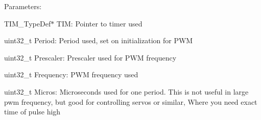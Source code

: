 Parameters\+:
\begin{DoxyItemize}
\item T\+I\+M\+\_\+\+Type\+Def$\ast$ T\+I\+M\+: Pointer to timer used
\begin{DoxyItemize}
\item uint32\+\_\+t Period\+: Period used, set on initialization for P\+W\+M
\item uint32\+\_\+t Prescaler\+: Prescaler used for P\+W\+M frequency
\item uint32\+\_\+t Frequency\+: P\+W\+M frequency used
\item uint32\+\_\+t Micros\+: Microseconds used for one period. This is not useful in large pwm frequency, but good for controlling servos or similar, Where you need exact time of pulse high 
\end{DoxyItemize}
\end{DoxyItemize}